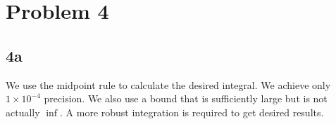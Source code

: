 \section{Problem 4}
\subsection{4a}



We use the midpoint rule to calculate the desired integral. We achieve only
$1 \times 10^{-4}$ precision. We also use a bound that is sufficiently large
but is not actually $\inf$. A more robust integration is required to get
desired results.


